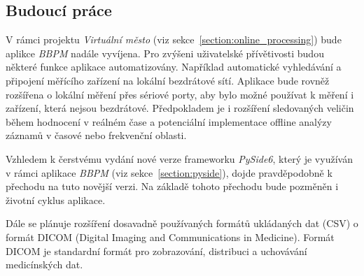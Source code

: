 \subsection{Budoucí práce}
V rámci projektu \textit{Virtuální město} (viz sekce~\ref{section:online_processing}) 
bude aplikce \textit{BBPM} nadále vyvíjena. Pro zvýšeni uživatelské přívětivosti budou 
některé funkce aplikace automatizovány. Například automatické vyhledávání a připojení 
měřícího zařízení na lokální bezdrátové sítí. Aplikace bude rovněž rozšířena o lokální
měření přes sériové porty, aby bylo možné používat k měření i zařízení, která nejsou
bezdrátové. Předpokladem je i rozšíření sledovaných veličin během hodnocení v reálném 
čase a potenciální implementace offline analýzy záznamů v časové nebo frekvenční oblasti. 

Vzhledem k čerstvému vydání nové verze frameworku \textit{PySide6}, který je využíván v rámci 
aplikace \textit{BBPM} (viz sekce~\ref{section:pyside}), dojde pravděpodobně k přechodu na 
tuto novější verzi. Na základě tohoto přechodu bude pozměněn i životní cyklus aplikace.

Dále se plánuje rozšíření dosavadně používaných formátů ukládaných dat (CSV) o formát 
DICOM (Digital Imaging and Communications in Medicine). Formát DICOM je standardní 
formát pro zobrazování, distribuci a uchovávání medicínských dat. 

